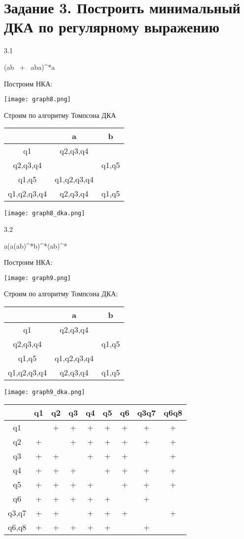 \documentclass{article}
\begin{document}
\section{Задание 3. Построить минимальный ДКА по регулярному выражению}


3.1

(ab \ + \ aba)^*a

Построим НКА:

\texttt{[image: graph8.png]}

Строим по алгоритму Томпсона ДКА


\begin{tabular}{ | c | c | c | }
\hline
 & a & b  \\ \hline
q1 & q2,q3,q4 &  \\ \hline
q2,q3,q4 &  & q1,q5  \\ \hline
q1,q5 & q1,q2,q3,q4 &  \\ \hline
q1,q2,q3,q4 & q2,q3,q4 & q1,q5 \\ \hline
\end{tabular}


\texttt{[image: graph8\_dka.png]}


3.2

a(a(ab)^*b)^*(ab)^*

Построим НКА:

\texttt{[image: graph9.png]}

Строим по алгоритму Томпсона ДКА:


\begin{tabular}{ | c | c | c | }
\hline
 & a & b  \\ \hline
q1 & q2,q3,q4 &  \\ \hline
q2,q3,q4 &  & q1,q5  \\ \hline
q1,q5 & q1,q2,q3,q4 &  \\ \hline
q1,q2,q3,q4 & q2,q3,q4 & q1,q5 \\ \hline
\end{tabular}


\texttt{[image: graph9\_dka.png]}


\begin{tabular}{ | c | c | c | c | c | c | c | c | c | }
\hline
 & q1 & q2 & q3 & q4 & q5 & q6 & q3q7 & q6q8  \\ \hline
q1 &  & + & + & + & + & + & + & +  \\ \hline
q2 & + &  & + & + & + & + & + & +   \\ \hline
q3 & + & + &  & + & + & + &  & + \\ \hline
q4 & + & + & + &  & + & + & + & + \\ \hline
q5 & + & + & + & + &  & + & + & + \\ \hline
q6 & + & + & + & + & + &  & + &   \\ \hline
q3,q7 & + & + &  & + & + & + &  & + \\ \hline
q6,q8 & + & + & + & + & + &  & + &   \\ \hline
\end{tabular}
\end{document}
